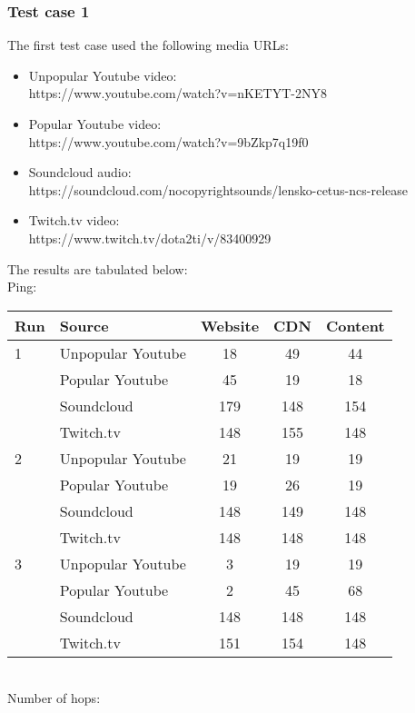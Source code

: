 \documentclass{sig-alternate-05-2015}
\begin{document}
\subsubsection{Test case 1}
The first test case used the following media URLs:
\begin{itemize}
	\item Unpopular Youtube video: \\ https://www.youtube.com/watch?v=nKETYT-2NY8
	\item Popular Youtube video: \\ https://www.youtube.com/watch?v=9bZkp7q19f0
	\item Soundcloud audio: \\ https://soundcloud.com/nocopyrightsounds/lensko-cetus-ncs-release
	\item Twitch.tv video: \\ https://www.twitch.tv/dota2ti/v/83400929
\end{itemize}
The results are tabulated below:
\vspace{1em} \\
Ping: \\
{\small
\begin{tabular}{|l|l|c|c|c|} \hline
Run & Source & Website & CDN & Content \\ \hline
1 & Unpopular Youtube & 18  & 49  & 44  \\ \hline
  & Popular Youtube   & 45  & 19  & 18  \\ \hline
  & Soundcloud        & 179 & 148 & 154 \\ \hline
  & Twitch.tv         & 148 & 155 & 148 \\ \hline
2 & Unpopular Youtube & 21  & 19  & 19  \\ \hline
  & Popular Youtube   & 19  & 26  & 19  \\ \hline
  & Soundcloud        & 148 & 149 & 148 \\ \hline
  & Twitch.tv         & 148 & 148 & 148 \\ \hline
3 & Unpopular Youtube & 3   & 19  & 19  \\ \hline
  & Popular Youtube   & 2   & 45  & 68  \\ \hline
  & Soundcloud        & 148 & 148 & 148 \\ \hline
  & Twitch.tv         & 151 & 154 & 148 \\ \hline
\end{tabular}}
\vspace{1em} \\
Number of hops: \\
\end{document}
